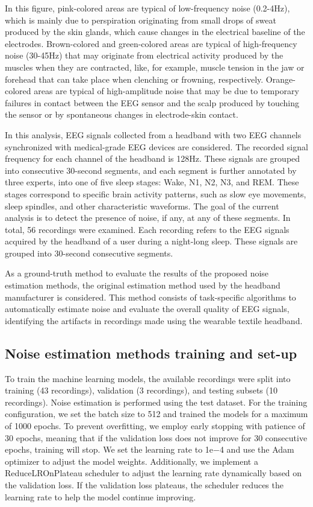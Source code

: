 \documentclass[conference]{IEEEtran}
\begin{document}
In this figure, pink-colored areas are typical of low-frequency noise (0.2-4Hz), which is mainly due to perspiration originating from small drops of sweat produced by the skin glands, which cause changes in the electrical baseline of the electrodes. Brown-colored and green-colored areas are typical of high-frequency noise (30-45Hz) that may originate from electrical activity produced by the muscles when they are contracted, like, for example, muscle tension in the jaw or forehead that can take place when clenching or frowning, respectively. Orange-colored areas are typical of high-amplitude noise that may be due to temporary failures in contact between the EEG sensor and the scalp produced by touching the sensor or by spontaneous changes in electrode-skin contact.

In this analysis, EEG signals collected from a headband with two EEG channels synchronized with medical-grade EEG devices are considered. The recorded signal frequency for each channel of the headband is 128Hz. These signals are grouped into consecutive 30-second segments, and each segment is further annotated by three experts, into one of five sleep stages: Wake, N1, N2, N3, and REM. These stages correspond to specific brain activity patterns, such as slow eye movements, sleep spindles, and other characteristic waveforms. The goal of the current analysis is to detect the presence of noise, if any, at any of these segments. In total, 56 recordings were examined. Each recording refers to the EEG signals acquired by the headband of a user during a night-long sleep. These signals are grouped into 30-second consecutive segments.

As a ground-truth method to evaluate the results of the proposed noise estimation methods, the original estimation method used by the headband manufacturer is considered. This method consists of task-specific algorithms to automatically estimate noise and evaluate the overall quality of EEG signals, identifying the artifacts in recordings made using the wearable textile headband.

\subsection{Noise estimation methods training and set-up} To train the machine learning models, the available recordings were split into training (43 recordings), validation (3 recordings), and testing subsets (10 recordings). Noise estimation is performed using the test dataset. For the training configuration, we set the batch size to 512 and trained the models for a maximum of 1000 epochs. To prevent overfitting, we employ early stopping with patience of 30 epochs, meaning that if the validation loss does not improve for 30 consecutive epochs, training will stop. We set the learning rate to 1e−4 and use the Adam optimizer to adjust the model weights. Additionally, we implement a ReduceLROnPlateau scheduler to adjust the learning rate dynamically based on the validation loss. If the validation loss plateaus, the scheduler reduces the learning rate to help the model continue improving.
\end{document}
